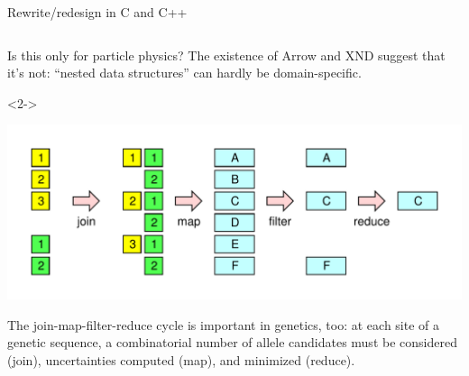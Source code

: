 \documentclass[aspectratio=169]{beamer}
\begin{document}
\begin{frame}{Rewrite/redesign in C and C++}
\begin{columns}
\end{columns}
\end{frame}

\begin{frame}{Is this only for particle physics?}
\large
\vspace{0.5 cm}
The existence of Arrow and XND suggest that it's not: ``nested data structures'' can hardly be domain-specific.

\vspace{-0.15 cm}
\begin{uncoverenv}<2->
\begin{center}
\includegraphics[width=0.6\linewidth]{explode-flat-reduce.pdf}
\end{center}

\vspace{-0.35 cm}
The join-map-filter-reduce cycle is important in genetics, too: at each site of a genetic sequence, a combinatorial number of allele candidates must be considered (join), uncertainties computed (map), and minimized (reduce).
\end{uncoverenv}

\vspace{0.5 cm}
\end{frame}
\end{document}
